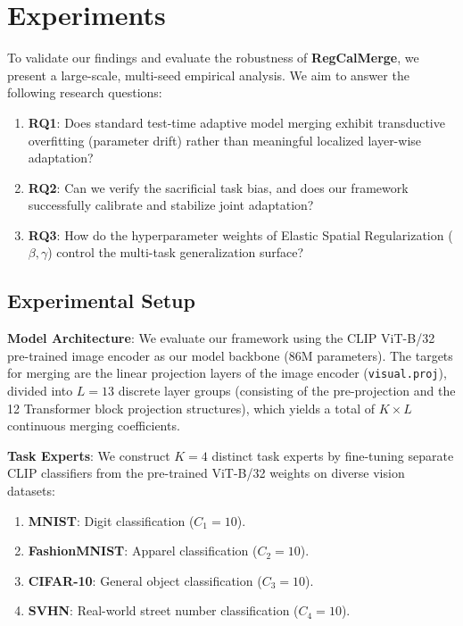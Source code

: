 \section{Experiments}
\label{sec:experiments}

To validate our findings and evaluate the robustness of \textbf{RegCalMerge}, we present a large-scale, multi-seed empirical analysis. We aim to answer the following research questions:
\begin{enumerate}
    \item \textbf{RQ1}: Does standard test-time adaptive model merging exhibit transductive overfitting (parameter drift) rather than meaningful localized layer-wise adaptation?
    \item \textbf{RQ2}: Can we verify the sacrificial task bias, and does our framework successfully calibrate and stabilize joint adaptation?
    \item \textbf{RQ3}: How do the hyperparameter weights of Elastic Spatial Regularization ($\beta, \gamma$) control the multi-task generalization surface?
\end{enumerate}

\subsection{Experimental Setup}
\textbf{Model Architecture}: We evaluate our framework using the CLIP ViT-B/32 pre-trained image encoder \cite{clip} as our model backbone (86M parameters). The targets for merging are the linear projection layers of the image encoder (\texttt{visual.proj}), divided into $L = 13$ discrete layer groups (consisting of the pre-projection and the 12 Transformer block projection structures), which yields a total of $K \times L$ continuous merging coefficients.

\textbf{Task Experts}: We construct $K = 4$ distinct task experts by fine-tuning separate CLIP classifiers from the pre-trained ViT-B/32 weights on diverse vision datasets:
\begin{enumerate}
    \item \textbf{MNIST}: Digit classification ($C_1 = 10$).
    \item \textbf{FashionMNIST}: Apparel classification ($C_2 = 10$).
    \item \textbf{CIFAR-10}: General object classification ($C_3 = 10$).
    \item \textbf{SVHN}: Real-world street number classification ($C_4 = 10$).
\end{enumerate}

